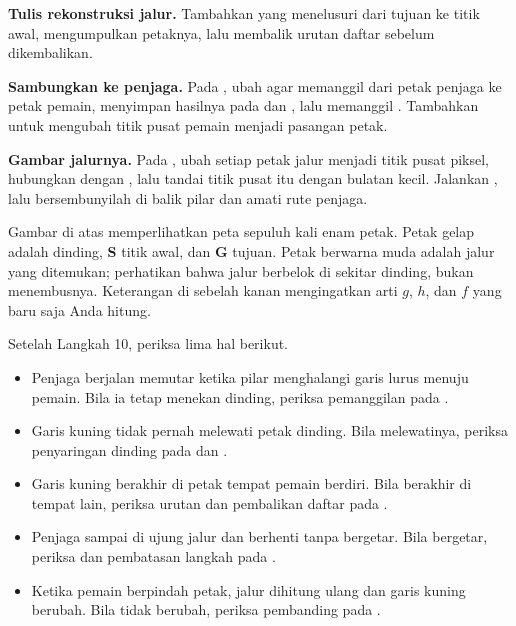 \begin{langkah}
  \item \textbf{Tulis rekonstruksi jalur.} Tambahkan 
        yang menelusuri  dari tujuan ke titik awal,
        mengumpulkan petaknya, lalu membalik urutan daftar sebelum
        dikembalikan.

  \item \textbf{Sambungkan ke penjaga.} Pada , ubah
         agar memanggil  dari petak penjaga ke
        petak pemain, menyimpan hasilnya pada  dan
        , lalu memanggil .
        Tambahkan  untuk mengubah titik pusat pemain
        menjadi pasangan petak.

  \item \textbf{Gambar jalurnya.} Pada , ubah setiap
        petak jalur menjadi titik pusat piksel, hubungkan dengan
        , lalu tandai titik pusat itu dengan
        bulatan kecil. Jalankan , lalu
        bersembunyilah di balik pilar dan amati rute penjaga.
\end{langkah}

\begin{center}

\end{center}

Gambar di atas memperlihatkan peta sepuluh kali enam petak. Petak gelap
adalah dinding, \textbf{S} titik awal, dan \textbf{G} tujuan. Petak berwarna
muda adalah jalur yang ditemukan; perhatikan bahwa jalur berbelok di sekitar
dinding, bukan menembusnya. Keterangan di sebelah kanan mengingatkan arti
$g$, $h$, dan $f$ yang baru saja Anda hitung.

\begin{ujibox}
Setelah Langkah 10, periksa lima hal berikut.
\begin{itemize}[leftmargin=1.4em, itemsep=0.2em]
  \item Penjaga berjalan memutar ketika pilar menghalangi garis lurus menuju
        pemain. Bila ia tetap menekan dinding, periksa pemanggilan
         pada .
  \item Garis kuning tidak pernah melewati petak dinding. Bila melewatinya,
        periksa penyaringan dinding pada  dan
        .
  \item Garis kuning berakhir di petak tempat pemain berdiri. Bila berakhir
        di tempat lain, periksa urutan  dan pembalikan
        daftar pada .
  \item Penjaga sampai di ujung jalur dan berhenti tanpa bergetar. Bila
        bergetar, periksa  dan pembatasan langkah
        pada .
  \item Ketika pemain berpindah petak, jalur dihitung ulang dan garis kuning
        berubah. Bila tidak berubah, periksa pembanding
         pada .
\end{itemize}
\end{ujibox}

